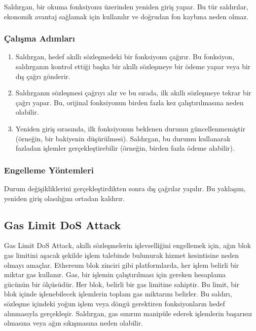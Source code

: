 Saldırgan, bir okuma fonksiyonu üzerinden yeniden giriş yapar. Bu tür saldırılar, ekonomik avantaj sağlamak için kullanılır ve doğrudan fon kaybına neden olmaz.

\subsubsection{Çalışma Adımları}

\begin{enumerate}
    \item Saldırgan, hedef akıllı sözleşmedeki bir fonksiyonu çağırır. Bu fonksiyon, saldırganın kontrol ettiği başka bir akıllı sözleşmeye bir ödeme yapar veya bir dış çağrı gönderir.
    \item Saldırganın sözleşmesi çağrıyı alır ve bu sırada, ilk akıllı sözleşmeye tekrar bir çağrı yapar. Bu, orijinal fonksiyonun birden fazla kez çalıştırılmasına neden olabilir.
    \item Yeniden giriş sırasında, ilk fonksiyonun beklenen durumu güncellenmemiştir (örneğin, bir bakiyenin düşürülmesi). Saldırgan, bu durumu kullanarak fazladan işlemler gerçekleştirebilir (örneğin, birden fazla ödeme alabilir).
\end{enumerate}

\subsubsection{Engelleme Yöntemleri}

Durum değişikliklerini gerçekleştirdikten sonra dış çağrılar yapılır. Bu yaklaşım, yeniden giriş olasılığını ortadan kaldırır.

\newpage

\subsection{Gas Limit DoS Attack}

Gas Limit DoS Attack, akıllı sözleşmelerin işlevselliğini engellemek için, ağın blok gas limitini aşacak şekilde işlem talebinde bulunurak hizmet kesintisine neden olmayı amaçlar. Ethereum blok zinciri gibi platformlarda, her işlem belirli bir miktar gas kullanır. Gas, bir işlemin çalıştırılması için gereken hesaplama gücünün bir ölçüsüdür. Her blok, belirli bir gas limitine sahiptir. Bu limit, bir blok içinde işlenebilecek işlemlerin toplam gas miktarını belirler. Bu saldırı, sözleşme içindeki yoğun işlem veya döngü gerektiren fonksiyonların hedef alınmasıyla gerçekleşir. Saldırgan, gas sınırını manipüle ederek işlemlerin başarısız olmasına veya ağın sıkışmasına neden olabilir.

